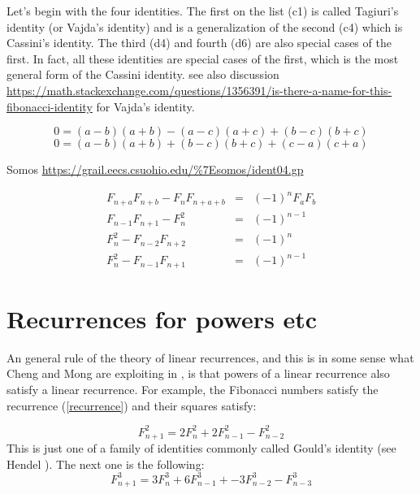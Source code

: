 \documentclass[12pt,a4paper]{amsart}
\begin{document}
Let's begin with the four identities.
The first on the list (c1) is called Tagiuri’s identity (or Vajda's
identity) and is a generalization of the second (c4) which is
Cassini's identity. The third (d4) and fourth (d6) are also special
cases of the first. In fact, all these identities are special cases
of the first, which is the most general form of the Cassini
identity.
see also discussion
\url{https://math.stackexchange.com/questions/1356391/is-there-a-name-for-this-fibonacci-identity}
for Vajda's identity.

$$0=(a-b)(a+b)-(a-c)(a+c)+(b-c)(b+c)$$
$$0=(a-b)(a+b)+(b-c)(b+c)+ (c-a)(c+a)$$

Somos \url{https://grail.eecs.csuohio.edu/%7Esomos/ident04.gp}


\begin{eqnarray*}
	F_{n+a}F_{n+b} - F_n F_{n+a+b} &=& (-1)^n F_a F_b\\
	F_{n-1}F_{n+1} - F_n^2 &=& (-1)^{n-1} \\
	F_n^2 - F_{n-2}F_{n+2} &=& (-1)^n \\
F_n^2 - F_{n-1}F_{n+1} &=& (-1)^{n-1}
\end{eqnarray*}
\section{Recurrences for powers etc}

An general rule of the theory of linear recurrences, 
and this  is in some sense what Cheng and Mong are
exploiting in \cite{cheng}, is that powers of a linear recurrence
also satisfy a linear recurrence. For example, the Fibonacci numbers
satisfy the recurrence (\ref{recurrence}) and their squares satisfy:

\begin{equation}
	F_{n+1}^2 = 2F_n^2 +  2F_{n-1}^2 - F_{n-2}^2
	\label{recurrence squares}
\end{equation}
This is just one of a family of identities commonly called 
Gould's identity (see Hendel \cite{hendel}). The next one is the following:
\begin{equation*}
	F_{n+1}^3 = 3F_n^3 + 6F_{n-1}^3 + -3F_{n-2}^3 - F_{n-3}^3
	\label{recurrence cubes}
\end{equation*}
\end{document}
